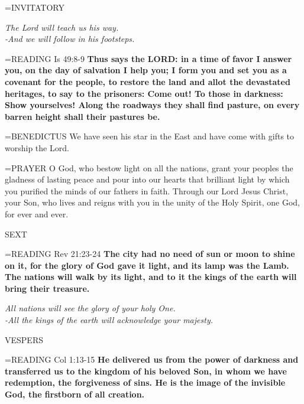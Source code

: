\hangindent=\parindent \small{INVITATORY}
\begin{center}
\textit{The Lord will teach us his way.\\}
\textit{-And we will follow in his footsteps.\\}
\end{center}

\hangindent=\parindent \small{READING}   Is 49:8-9 \textbf{  Thus says the LORD: in a time of favor I answer you, on the day of salvation I help you; I form you and set you as a covenant for the people, to restore the land and allot the devastated heritages, to say to the prisoners: Come out! To those in darkness: Show yourselves! Along the roadways they shall find pasture, on every barren height shall their pastures be.\\}

\hangindent=\parindent \small{BENEDICTUS 	We have seen his star in the East and have come with gifts to worship the Lord.\\}

\hangindent=\parindent \small{PRAYER 	O God, who bestow light on all the nations, grant your peoples the gladness of lasting peace and pour into our hearts that brilliant light by which you purified the minds of our fathers in faith. Through our Lord Jesus Christ, your Son, who lives and reigns with you in the unity of the Holy Spirit, one God, for ever and ever.}

\begin{flushleft}\normalsize SEXT\\\end{flushleft}

\hangindent=\parindent \small{READING}   Rev 21:23-24 \textbf{  The city had no need of sun or moon to shine on it, for the glory of God gave it light, and its lamp was the Lamb. The nations will walk by its light, and to it the kings of the earth will bring their treasure.}

\begin{center}
\textit{All nations will see the glory of your holy One.\\
-All the kings of the earth will acknowledge your majesty.}
\end{center}

\begin{flushleft}\normalsize VESPERS\\\end{flushleft}

\hangindent=\parindent \small{READING}   Col 1:13-15 \textbf{  He delivered us from the power of darkness and transferred us to the kingdom of his beloved Son, in whom we have redemption, the forgiveness of sins. He is the image of the invisible God, the firstborn of all creation.\\}

